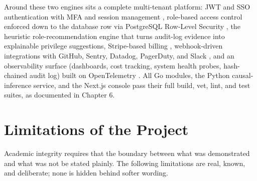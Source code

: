 Around these two engines sits a complete multi-tenant platform: JWT and SSO
authentication with MFA and session management \cite{workos}, role-based
access control enforced down to the database row via PostgreSQL Row-Level
Security \cite{pgrls}, the heuristic role-recommendation engine that turns
audit-log evidence into explainable privilege suggestions, Stripe-based
billing \cite{stripe}, webhook-driven integrations with GitHub, Sentry,
Datadog, PagerDuty, and Slack \cite{sentry,datadog,pagerduty,slackapi}, and
an observability surface (dashboards, cost tracking, system health probes,
hash-chained audit log) built on OpenTelemetry \cite{otel}. All Go modules,
the Python causal-inference service, and the Next.js console pass their full
build, vet, lint, and test suites, as documented in Chapter 6.

\section{Limitations of the Project}

Academic integrity requires that the boundary between what was demonstrated
and what was not be stated plainly. The following limitations are real,
known, and deliberate; none is hidden behind softer wording.

